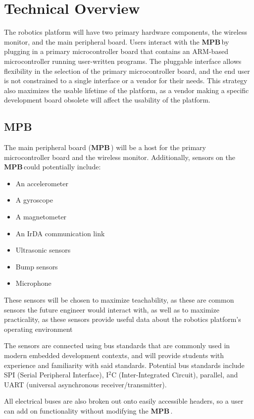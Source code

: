 \documentclass[letterpaper]{article}
\newcommand{\MPB}{\textbf{MPB}\,}
\begin{document}
\section{Technical Overview}
The robotics platform will have two primary hardware components, the wireless monitor, and the main peripheral board. Users interact with the \MPB by plugging in a primary microcontroller board that contains an ARM-based microcontroller running user-written programs. The pluggable interface allows flexibility in the selection of the primary microcontroller board, and the end user is not constrained to a single interface or a vendor for their needs. This strategy also maximizes the usable lifetime of the platform, as a vendor making a specific development board obsolete will affect the usability of the platform.


\subsection{\MPB}
The main peripheral board (\MPB) will be a host for the primary microcontroller board and the wireless monitor. Additionally, sensors on the \MPB could potentially include:

\begin{itemize}
\item An accelerometer
\item A gyroscope
\item A magnetometer
\item An IrDA communication link
\item Ultrasonic sensors
\item Bump sensors
\item Microphone

\end{itemize}


These sensors will be chosen to maximize teachability, as these are common sensors the future engineer would interact with, as well as to maximize practicality, as these sensors provide useful data about the robotics platform's operating environment

The sensors are connected using bus standards that are commonly used in modern embedded development contexts, and will provide students with experience and familiarity with said standards. Potential bus standards include SPI (Serial Peripheral Interface), I$^2$C (Inter-Integrated Circuit), parallel, and UART (universal asynchronous receiver/transmitter).

All electrical buses are also broken out onto easily accessible headers, so a user can add on functionality without modifying the \MPB.
\end{document}
